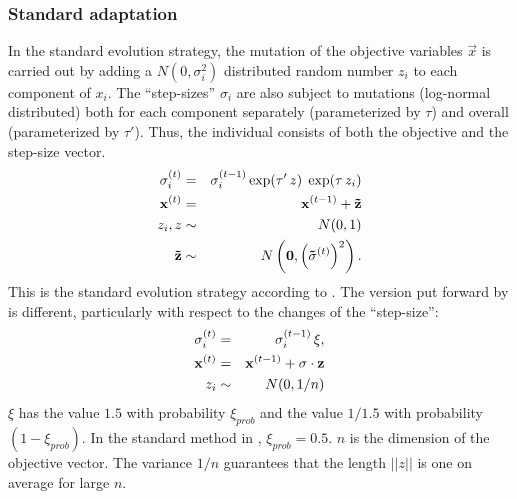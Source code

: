 \subsubsection{Standard adaptation}
\label{ss:standard}
In the standard evolution strategy, the mutation of the objective
variables $\vec{x}$ is carried out by adding a $N(0,\sigma_i^2)$ 
distributed random number $z_i$ to each component of $x_i$. The
``step-sizes'' $\sigma_i$ are also subject to mutations
(log-normal distributed) both for each component separately
(parameterized by $\tau$) and overall (parameterized by $\tau'$).
Thus, the individual consists of both the objective and the step-size 
vector. 
\begin{eqnarray}
\sigma_i^{(t)} & = & \sigma_i^{(t-1)} \exp( \tau' \, z) \; \exp( \tau \,z_i)\\
\mathbf{x}^{(t)} & = & \mathbf{x}^{(t-1)} + \mathbf{\tilde z}\\
z_i, z & \sim & N(0,1)\\
\mathbf{\tilde z}& \sim & N\left(\mathbf{0}, \left({\mathbf{{\tilde \sigma}}^{(t)}}\right)^{2}\right).
\end{eqnarray}
This is the
standard evolution strategy according to \cite{Baeck:96,Schwefel:95}.
The version put forward by \cite{Rechenberg:94} is different,
particularly with respect to the changes of the ``step-size'':
\begin{eqnarray}
\sigma_i^{(t)} & = & \sigma_i^{(t-1)} \,\xi,\\
\mathbf{x}^{(t)} & = & \mathbf{x}^{(t-1)} + \mathbf{\sigma}\cdot \mathbf{z}\\
z_i & \sim & N(0,1/n)
\end{eqnarray}
$\xi$ has the value $1.5$ with probability $\xi_{prob}$ and 
the value $1/1.5$ with probability $(1-\xi_{prob})$. In the standard
method in \cite{Rechenberg:94}, $\xi_{prob} = 0.5$.
$n$ is the dimension of the objective vector. The 
variance $1/n$ guarantees that the length $||z||$ is one on average
for large $n$.

